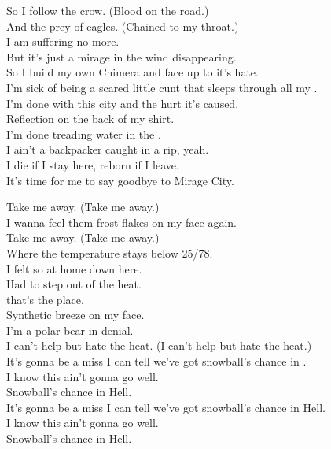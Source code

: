 So I follow the crow. (Blood on the road.) \\
And the prey of eagles. (Chained to my throat.) \\
I am suffering no more. \\
But it's just a mirage in the wind disappearing. \\

So I build my own Chimera and face up to it's hate. \\
I'm sick of being a scared little cunt that sleeps through all my . \\
I'm done with this city and the hurt it's caused. \\
Reflection on the back of my shirt. \\
I'm done treading water in the . \\
I ain't a backpacker caught in a rip, yeah. \\
I die if I stay here, reborn if I leave. \\
It's time for me to say goodbye to Mirage City. \\



Take me away. (Take me away.) \\
I wanna feel them frost flakes on my face again. \\
Take me away. (Take me away.) \\
Where the temperature stays below 25/78. \\

I felt so at home down here. \\
Had to step out of the heat. \\
 that's the place. \\
Synthetic breeze on my face. \\
I'm a polar bear in denial. \\
I can't help but hate the heat. (I can't help but hate the heat.) \\

It's gonna be a miss I can tell we've got snowball's chance in . \\
I know this ain't gonna go well. \\
Snowball's chance in Hell. \\
It's gonna be a miss I can tell we've got snowball's chance in Hell. \\
I know this ain't gonna go well. \\
Snowball's chance in Hell. \\

